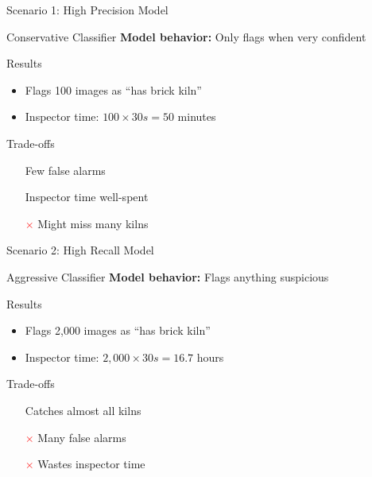\documentclass{beamer}
\begin{document}
\begin{frame}{Scenario 1: High Precision Model}
\footnotesize
\begin{examplebox}{Conservative Classifier}
\small
\textbf{Model behavior:} Only flags when very confident
\end{examplebox}

\begin{block}{Results}
\begin{itemize}
    \item Flags 100 images as ``has brick kiln''
    \item Inspector time: $100 \times 30s = 50$ minutes
\end{itemize}
\end{block}

\begin{keypointsbox}{Trade-offs}
\small
\begin{itemize}
    \item[\textcolor{green}{\checkmark}] Few false alarms
    \item[\textcolor{green}{\checkmark}] Inspector time well-spent
    \item[\textcolor{red}{$\times$}] Might miss many kilns
\end{itemize}
\end{keypointsbox}
\end{frame}

\begin{frame}{Scenario 2: High Recall Model}
\footnotesize
\begin{examplebox}{Aggressive Classifier}
\small
\textbf{Model behavior:} Flags anything suspicious
\end{examplebox}

\begin{block}{Results}
\begin{itemize}
    \item Flags 2,000 images as ``has brick kiln''
    \item Inspector time: $2{,}000 \times 30s = 16.7$ hours
\end{itemize}
\end{block}

\begin{keypointsbox}{Trade-offs}
\small
\begin{itemize}
    \item[\textcolor{green}{\checkmark}] Catches almost all kilns
    \item[\textcolor{red}{$\times$}] Many false alarms
    \item[\textcolor{red}{$\times$}] Wastes inspector time
\end{itemize}
\end{keypointsbox}
\end{frame}
\end{document}
